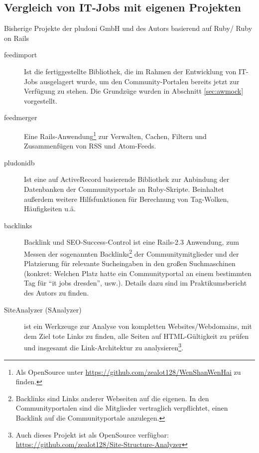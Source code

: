 \subsection{Vergleich von IT-Jobs mit eigenen Projekten}

Bisherige Projekte der pludoni GmbH und des Autors basierend auf Ruby/ Ruby on Rails
\begin{description}
 \item[feedimport] Ist die fertiggestellte Bibliothek, die im Rahmen der Entwicklung von IT-Jobs ausgelagert wurde, um den Community-Portalen bereits jetzt zur Verfügung zu stehen. Die Grundzüge wurden in Abschnitt \ref{sec:awmock} vorgestellt.
 \item[feedmerger] Eine Rails-Anwendung\footnote{ Als OpenSource unter \url{https://github.com/zealot128/WenShanWenHai} zu finden.} zur Verwalten, Cachen, Filtern und Zusammenfügen von RSS und Atom-Feeds.
 \item[pludonidb] Ist eine auf ActiveRecord basierende Bibliothek zur Anbindung der Datenbanken der Communityportale an Ruby-Skripte. Beinhaltet außerdem weitere Hilfsfunktionen für Berechnung von Tag-Wolken, Häufigkeiten u.ä.
 \item[backlinks] Backlink und SEO-Success-Control ist eine Rails-2.3 Anwendung, zum Messen der sogenannten Backlinks\footnote{Backlinks sind Links anderer Webseiten auf die eigenen. In den Communityportalen sind die Mitglieder vertraglich verpflichtet, einen Backlink auf die Communityportale anzulegen.} der Communitymitglieder und der Platzierung für relevante Sucheingaben in den großen Suchmaschinen (konkret: Welchen Platz hatte ein Communityportal an einem bestimmten Tag für "`it jobs dresden"', usw.). Details dazu sind im Praktikumsbericht des Autors zu finden. %
 
 \item[SiteAnalyzer (SAnalyzer)] ist ein Werkzeuge zur Analyse von kompletten Websites/Webdomains, mit dem Ziel tote Links zu finden, alle Seiten auf HTML-Gültigkeit zu prüfen und insgesamt die Link-Architektur zu analysieren\footnote{Auch dieses Projekt ist als OpenSource verfügbar: \url{https://github.com/zealot128/Site-Structure-Analyzer}}. 
\end{description}


